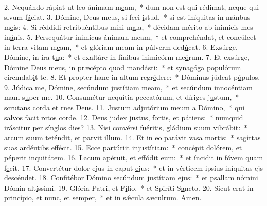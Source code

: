 2. Nequándo rápiat ut leo ánimam m\uline{e}am,~* dum non est qui rédimat, neque qui slvum f\uline{á}ciat.
3. Dómine, Deus meus, si feci \uline{i}stud.~* si est iníquitas in mánbus m\uline{e}is:
4. Si réddidi retribuéntibus mihi m\uline{a}la,~* décidam mérito ab inimícis mes in\uline{á}nis.
5. Persequátur inimícus ánimam meam,~† et comprehéndat, et concúlcet in terra vitam m\uline{e}am,~* et glóriam meam in púlverm ded\uline{ú}cat.
6. Exsúrge, Dómine, in ira t\uline{u}a:~* et exaltáre in fínibus inimicórm me\uline{ó}rum.
7. Et exsúrge, Dómine Deus meus, in præcépto quod mand\uline{á}sti:~* et synagóga populórum circmdab\uline{i}t te.
8. Et propter hanc in altum regr\uline{é}dere:~* Dóminus júdcat p\uline{ó}pulos.
9. Júdica me, Dómine, secúndum justítiam m\uline{e}am,~* et secúndum innocéntiam mam s\uline{u}per me.
10. Consumétur nequítia peccatórum, et díriges j\uline{u}stum,~* scrutans corda et rnes D\uline{e}us.
11. Justum adjutórium meum a D\uline{ó}mino,~* qui salvos facit rctos c\uline{o}rde.
12. Deus judex justus, fortis, et p\uline{á}tiens:~* numquid iráscitur per sínglos d\uline{i}es?
13. Nisi convérsi fuéritis, gládium suum vibr\uline{á}bit:~* arcum suum teténdit, et parvit \uline{i}llum.
14. Et in eo parávit vasa m\uline{o}rtis:~* sagíttas suas ardéntibs eff\uline{é}cit.
15. Ecce partúriit injust\uline{í}tiam:~* concépit dolórem, et péperit inquit\uline{á}tem.
16. Lacum apéruit, et effódit \uline{e}um:~* et íncidit in fóvem quam f\uline{e}cit.
17. Convertétur dolor ejus in caput \uline{e}jus:~* et in vérticem ipsíus iníquitas ejs desc\uline{é}ndet.
18. Confitébor Dómino secúndum justítiam \uline{e}jus:~* et psallam nómini Dómin alt\uline{í}ssimi.
19. Glória Patri, et F\uline{í}lio,~* et Spiríti S\uline{a}ncto.
20. Sicut erat in princípio, et nunc, et s\uline{e}mper,~* et in sǽcula sæculrum. \uline{A}men.
